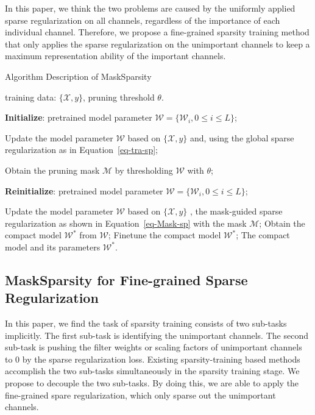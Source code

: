 \documentclass[review]{cvpr}
\begin{document}
In this paper, we think the two problems are caused by the uniformly applied sparse regularization on all channels, regardless of the importance of each individual channel. Therefore, we propose a fine-grained sparsity training method that only applies the sparse regularization on the unimportant channels to keep a maximum representation ability of the important channels. 
\begin{algorithm}[t]
	\caption{Algorithm Description of MaskSparsity}
	\label{alg:FPGM}
	
	\begin{algorithmic}[1]
		\INPUT training data: $\{\mathcal{X},y\}$, pruning threshold $\theta$.
		
		\State  \textbf{Initialize}: pretrained model parameter $\mathcal{W}=\{\mathcal{W} _{i}, 0\leq i \leq L\}$;  
		
		\State Update the model parameter $\mathcal{W}$ based on $\{\mathcal{X},y\}$ and, using the global sparse regularization as in Equation~\ref{eq-tra-sp};
		\EndFor
		
		\State Obtain the pruning mask $\mathcal{M}$ by thresholding $\mathcal{W}$ with $\theta$;
		
		\State  \textbf{Reinitialize}: pretrained model parameter $\mathcal{W}=\{\mathcal{W} _{i}, 0\leq i \leq L\}$;
		
		\State Update the model parameter $\mathcal{W}$ based on $\{\mathcal{X},y\}$ , the mask-guided sparse regularization as shown in Equation~\ref{eq-Mask-sp} with the mask $\mathcal{M}$;
		\EndFor
		\State Obtain the compact model $\mathcal{W} ^{*}$ from $\mathcal{W}$;
		\State Finetune the compact model $\mathcal{W} ^{*}$;
		\OUTPUT The compact model and its parameters $\mathcal{W} ^{*}$.
	\end{algorithmic} 
\end{algorithm}
\subsection{MaskSparsity for Fine-grained Sparse Regularization}\label{MaskSP}

In this paper, we find the task of sparsity training consists of two sub-tasks implicitly. The first sub-task is identifying the unimportant channels. The second sub-task is pushing the filter weights or scaling factors of unimportant channels to 0 by the sparse regularization loss. Existing sparsity-training based methods accomplish the two sub-tasks simultaneously in the sparsity training stage. We propose to decouple the two sub-tasks. By doing this, we are able to apply the fine-grained spare regularization, which only sparse out the unimportant channels.
\end{document}
